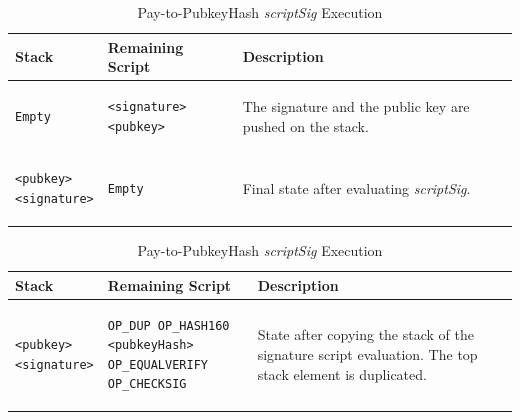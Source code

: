 \begin{table}[!ht]
  
\begin{minipage}{\textwidth}

\centering
\begin{tabular}{| m{95pt} | m{145pt} | m{100pt} |}
\hline
\textbf{Stack} & \textbf{Remaining Script} & \textbf{Description} \\ \hline \hline

\vspace{8pt}
\begin{BVerbatim}[fontsize==\relsize{-4}]
Empty
\end{BVerbatim} 
\vspace{4pt}
&
\vspace{8pt}
\begin{BVerbatim}[fontsize==\relsize{-4}]
<signature> <pubkey>
\end{BVerbatim} 
\vspace{4pt}
&
The signature and the public key are pushed on the stack. \\ \hline


\vspace{8pt}
\begin{BVerbatim}[fontsize==\relsize{-4}]
<pubkey>
<signature>
\end{BVerbatim} 
\vspace{4pt}
&
\vspace{8pt}
\begin{BVerbatim}[fontsize==\relsize{-4}]
Empty
\end{BVerbatim} 
\vspace{4pt}
&
Final state after evaluating \textit{scriptSig}. \\ \hline

\end{tabular}
\vspace{5pt}
\caption{Pay-to-PubkeyHash \textit{scriptSig} Execution}
\label{tab:P2PubHash1}

\vspace{15pt}

\centering
\begin{tabular}{| m{95pt} | m{145pt} | m{100pt} |}
\hline
\textbf{Stack} & \textbf{Remaining Script} & \textbf{Description} \\ \hline \hline

\vspace{8pt}
\begin{BVerbatim}[fontsize==\relsize{-4}]
<pubkey>
<signature>
\end{BVerbatim}
\vspace{4pt}
&
\vspace{8pt}
\begin{BVerbatim}[fontsize==\relsize{-4}]
OP_DUP OP_HASH160 <pubkeyHash>
OP_EQUALVERIFY OP_CHECKSIG
\end{BVerbatim} 
\vspace{4pt}
&
State after copying the stack of the signature script evaluation. The top stack element is duplicated.\\ \hline



\end{tabular}
\end{minipage}
\end{table}
